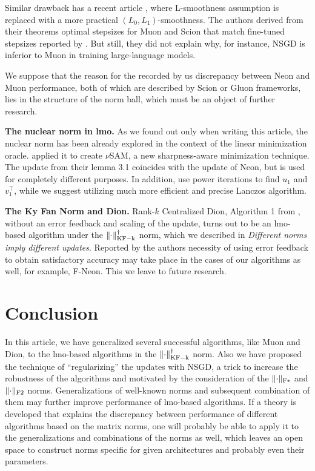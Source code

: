 \documentclass{article} %
\DeclarePairedDelimiter{\normkfk}{\|}{\|_\mathrm{KF-k}}
\DeclarePairedDelimiter{\normfstar}{\|}{\|_\mathrm{F*}}
\DeclarePairedDelimiter{\normftwo}{\|}{\|_\mathrm{F2}}
\begin{document}
Similar drawback has a recent article \cite{riabinin2025gluon}, where L-smoothness assumption is replaced with a more practical $(L_0, L_1)$-smoothness. The authors derived from their theorems optimal stepsizes for Muon and Scion that match fine-tuned stepsizes reported by \cite{pethick2025training}. But still, they did not explain why, for instance, NSGD is inferior to Muon in training large-language models.

We suppose that the reason for the recorded by us discrepancy between Neon and Muon performance, both of which are described by Scion or Gluon frameworks, lies in the structure of the norm ball, which must be an object of further research.

{\bf The nuclear norm in lmo.} As we found out only when writing this article, the nuclear norm has been already explored in the context of the linear minimization oracle. \cite{pethick2025sam} applied it to create $\nu$SAM, a new sharpness-aware minimization technique. The update from their lemma 3.1 coincides with the update of Neon, but is used for completely different purposes. In addition, \cite{pethick2025sam} use power iterations to find $u_1$ and $v_1^\top$, while we suggest utilizing much more efficient and precise Lanczos algorithm.

{\bf The Ky Fan Norm and Dion.} Rank-$k$ Centralized Dion, Algorithm 1 from \cite{ahn2025dioncommunicationefficientoptimizerlarge}, without an error feedback and scaling of the update, turns out to be an lmo-based algorithm under the $\normkfk{\cdot}^\dagger$ norm, which we described in {\it Different norms imply different updates}. Reported by the authors necessity of using error feedback to obtain satisfactory accuracy may take place in the cases of our algorithms as well, for example, F-Neon. This we leave to future research.



\section{Conclusion}
In this article, we have generalized several successful algorithms, like Muon and Dion, to the lmo-based algorithms in the $\normkfk{\cdot}^\dagger$ norm. Also we have proposed the technique of ``regularizing'' the updates with NSGD, a trick to increase the robustness of the algorithms and motivated by the consideration of the $\normfstar{\cdot}$ and $\normftwo{\cdot}$ norms. Generalizations of well-known norms and subsequent combination of them may further improve performance of lmo-based algorithms. If a theory is developed that explains the discrepancy between performance of different algorithms based on the matrix norms, one will probably be able to apply it to the generalizations and combinations of the norms as well, which leaves an open space to construct norms specific for given architectures and probably even their parameters.
\end{document}

